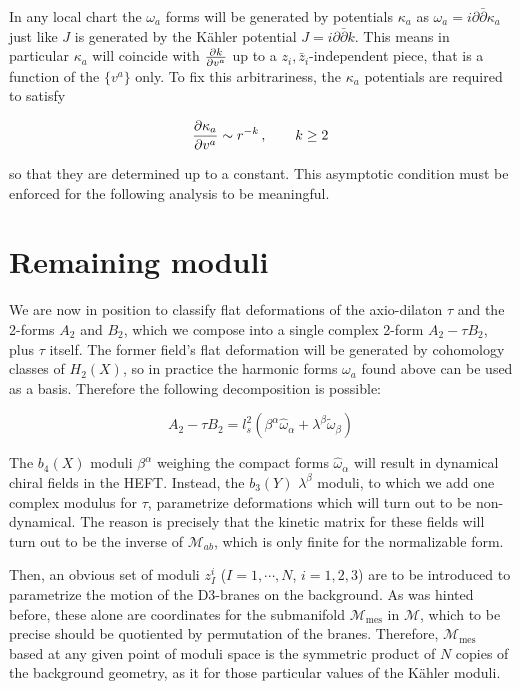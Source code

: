 In any local chart the $\omega_a$ forms will be generated by potentials $\kappa_a$ as ${\omega_a = i \partial \bar \partial \kappa_a}$ just like $J$ is generated by the K\"ahler potential $J = i \partial \bar \partial k$. This means in particular $\kappa_a$ will coincide with $\frac{\partial k}{\partial v^a}$ up to a $z_i, \bar z_i$-independent piece, that is a function of the $\{v^a\}$ only. To fix this arbitrariness, the $\kappa_a$ potentials are required to satisfy

\begin{equation}
	\frac{\partial\kappa_a}{\partial v^a} \sim r^{-k}\,, \quad \quad k \geq 2
	\label{asycond}
\end{equation}

so that they are determined up to a constant. This asymptotic condition must be enforced for the following analysis to be meaningful.

\section{Remaining moduli}\label{sec:hefttwo}

We are now in position to classify flat deformations of the axio-dilaton $\tau$ and the 2-forms $A_2$ and $B_2$, which we compose into a single complex 2-form $A_2 - \tau B_2$, plus $\tau$ itself. The former field's flat deformation will be generated by cohomology classes of $H_2(X)$, so in practice the harmonic forms $\omega_a$ found above can be used as a basis. Therefore the following decomposition is possible:

\begin{equation}
	A_2 - \tau B_2 = l_s^2 \left( \beta^\alpha \hat\omega_\alpha + \lambda^\beta \tilde \omega_\beta \right)
	\label{ABvariation}
\end{equation}

The $b_4(X)$ moduli $\beta^\alpha$ weighing the compact forms $\hat\omega_\alpha$ will result in dynamical chiral fields in the HEFT. Instead, the $b_3(Y)$ $\lambda^\beta$ moduli, to which we add one complex modulus for $\tau$, parametrize deformations which will turn out to be non-dynamical. The reason is precisely that the kinetic matrix for these fields will turn out to be the inverse of $\mathcal{M}_{ab}$, which is only finite for the normalizable form.

Then, an obvious set of moduli $z_I^i$ ($I=1,\cdots,N$, $i = 1,2,3$) are to be introduced to parametrize the motion of the D3-branes on the background. As was hinted before, these alone are coordinates for the submanifold $\mathcal{M}_\text{mes}$ in $\mathcal{M}$, which to be precise should be quotiented by permutation of the branes. Therefore, $\mathcal{M}_\text{mes}$ based at any given point of moduli space is the symmetric product of $N$ copies of the background geometry, as it for those particular values of the K\"ahler moduli.

